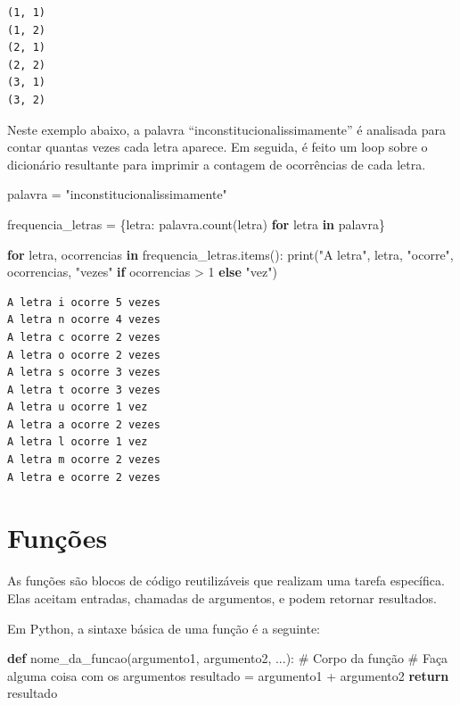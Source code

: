 \documentclass[
  portuguese,
  letterpaper,
  DIV=11,
  numbers=noendperiod]{scrreprt}
\newenvironment{Shaded}{\begin{snugshade}}{\end{snugshade}}
\newcommand{\BuiltInTok}[1]{\textcolor[rgb]{0.00,0.23,0.31}{#1}}
\newcommand{\CommentTok}[1]{\textcolor[rgb]{0.37,0.37,0.37}{#1}}
\newcommand{\ControlFlowTok}[1]{\textcolor[rgb]{0.00,0.23,0.31}{\textbf{#1}}}
\newcommand{\DecValTok}[1]{\textcolor[rgb]{0.68,0.00,0.00}{#1}}
\newcommand{\KeywordTok}[1]{\textcolor[rgb]{0.00,0.23,0.31}{\textbf{#1}}}
\newcommand{\NormalTok}[1]{\textcolor[rgb]{0.00,0.23,0.31}{#1}}
\newcommand{\OperatorTok}[1]{\textcolor[rgb]{0.37,0.37,0.37}{#1}}
\newcommand{\StringTok}[1]{\textcolor[rgb]{0.13,0.47,0.30}{#1}}
\theoremstyle{definition}
\theoremstyle{remark}
\begin{document}
\begin{verbatim}
(1, 1)
(1, 2)
(2, 1)
(2, 2)
(3, 1)
(3, 2)
\end{verbatim}

Neste exemplo abaixo, a palavra ``inconstitucionalissimamente'' é
analisada para contar quantas vezes cada letra aparece. Em seguida, é
feito um loop sobre o dicionário resultante para imprimir a contagem de
ocorrências de cada letra.

\begin{Shaded}
\begin{Highlighting}[]
\NormalTok{palavra }\OperatorTok{=} \StringTok{"inconstitucionalissimamente"}

\NormalTok{frequencia\_letras }\OperatorTok{=}\NormalTok{ \{letra: palavra.count(letra) }\ControlFlowTok{for}\NormalTok{ letra }\KeywordTok{in}\NormalTok{ palavra\}}

\ControlFlowTok{for}\NormalTok{ letra, ocorrencias }\KeywordTok{in}\NormalTok{ frequencia\_letras.items():}
    \BuiltInTok{print}\NormalTok{(}\StringTok{"A letra"}\NormalTok{, letra, }\StringTok{"ocorre"}\NormalTok{, ocorrencias, }\StringTok{"vezes"} \ControlFlowTok{if}\NormalTok{ ocorrencias }\OperatorTok{\textgreater{}} \DecValTok{1} \ControlFlowTok{else} \StringTok{"vez"}\NormalTok{)}
\end{Highlighting}
\end{Shaded}

\begin{verbatim}
A letra i ocorre 5 vezes
A letra n ocorre 4 vezes
A letra c ocorre 2 vezes
A letra o ocorre 2 vezes
A letra s ocorre 3 vezes
A letra t ocorre 3 vezes
A letra u ocorre 1 vez
A letra a ocorre 2 vezes
A letra l ocorre 1 vez
A letra m ocorre 2 vezes
A letra e ocorre 2 vezes
\end{verbatim}

\section{Funções}\label{funuxe7uxf5es}

As funções são blocos de código reutilizáveis que realizam uma tarefa
específica.\\
Elas aceitam entradas, chamadas de argumentos, e podem retornar
resultados.

Em Python, a sintaxe básica de uma função é a seguinte:

\begin{Shaded}
\begin{Highlighting}[]
\KeywordTok{def}\NormalTok{ nome\_da\_funcao(argumento1, argumento2, ...):}
    \CommentTok{\# Corpo da função}
    \CommentTok{\# Faça alguma coisa com os argumentos}
\NormalTok{    resultado }\OperatorTok{=}\NormalTok{ argumento1 }\OperatorTok{+}\NormalTok{ argumento2}
    \ControlFlowTok{return}\NormalTok{ resultado}
\end{Highlighting}
\end{Shaded}
\end{document}
